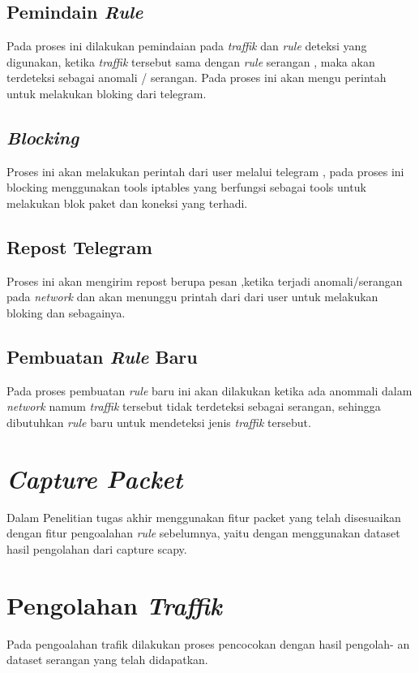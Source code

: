	\subsection{Pemindain \emph{Rule}}
	Pada proses ini dilakukan pemindaian pada \emph{traffik} dan \emph{rule} deteksi yang digunakan, ketika \emph{traffik} tersebut sama dengan \emph{rule} serangan , maka akan terdeteksi sebagai anomali / serangan. Pada proses ini akan mengu perintah untuk melakukan bloking dari telegram.
	
	\subsection{\emph{Blocking}}
	Proses ini akan melakukan perintah dari user melalui telegram , pada proses ini blocking menggunakan tools iptables yang berfungsi sebagai tools untuk melakukan blok paket dan koneksi yang terhadi.
	
	\subsection{Repost Telegram}
	Proses ini akan mengirim repost berupa pesan ,ketika terjadi anomali/serangan pada \emph{network} dan akan menunggu printah dari dari user untuk melakukan bloking dan sebagainya.
	
	\subsection{Pembuatan \emph{Rule} Baru}
	Pada proses pembuatan \emph{rule} baru ini akan dilakukan ketika ada anommali dalam \emph{network} namum \emph{traffik} tersebut tidak terdeteksi sebagai serangan, sehingga dibutuhkan \emph{rule} baru untuk mendeteksi jenis \emph{traffik} tersebut.
\section{\emph{Capture Packet}}
Dalam Penelitian tugas akhir menggunakan fitur packet yang telah disesuaikan
dengan fitur pengoalahan \emph{rule} sebelumnya, yaitu dengan menggunakan dataset hasil
pengolahan dari capture scapy.

\section{Pengolahan \emph{Traffik}}
Pada pengoalahan trafik dilakukan proses pencocokan dengan hasil pengolah-
an dataset serangan yang telah didapatkan.

